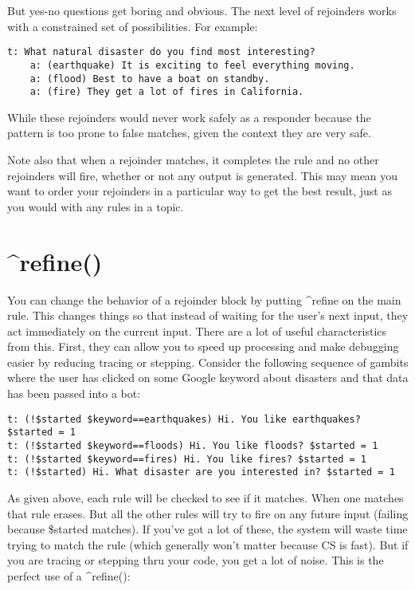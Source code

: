 \documentclass[]{article}
\begin{document}
But yes-no questions get boring and obvious. The next level of
rejoinders works with a constrained set of possibilities. For example:

\begin{verbatim}
t: What natural disaster do you find most interesting?
    a: (earthquake) It is exciting to feel everything moving.
    a: (flood) Best to have a boat on standby.
    a: (fire) They get a lot of fires in California.
\end{verbatim}

While these rejoinders would never work safely as a responder because
the pattern is too prone to false matches, given the context they are
very safe.

Note also that when a rejoinder matches, it completes the rule and no
other rejoinders will fire, whether or not any output is generated. This
may mean you want to order your rejoinders in a particular way to get
the best result, just as you would with any rules in a topic.

\section{\^{}refine()}\label{refine}

You can change the behavior of a rejoinder block by putting \^{}refine
on the main rule. This changes things so that instead of waiting for the
user's next input, they act immediately on the current input. There are
a lot of useful characteristics from this. First, they can allow you to
speed up processing and make debugging easier by reducing tracing or
stepping. Consider the following sequence of gambits where the user has
clicked on some Google keyword about disasters and that data has been
passed into a bot:

\begin{verbatim}
t: (!$started $keyword==earthquakes) Hi. You like earthquakes? $started = 1
t: (!$started $keyword==floods) Hi. You like floods? $started = 1
t: (!$started $keyword==fires) Hi. You like fires? $started = 1
t: (!$started) Hi. What disaster are you interested in? $started = 1
\end{verbatim}

As given above, each rule will be checked to see if it matches. When one
matches that rule erases. But all the other rules will try to fire on
any future input (failing because \$started matches). If you've got a
lot of these, the system will waste time trying to match the rule (which
generally won't matter because CS is fast). But if you are tracing or
stepping thru your code, you get a lot of noise. This is the perfect use
of a \^{}refine():
\end{document}
